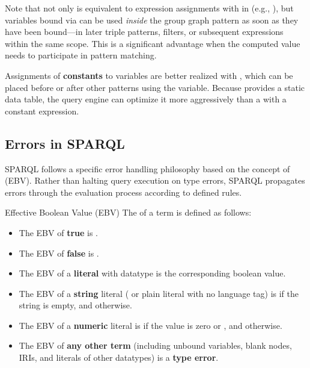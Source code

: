 \begin{note}{}
    Note that not only is  equivalent to expression assignments with  in  (e.g., ), but variables bound via  can be used \emph{inside} the group graph pattern as soon as they have been bound---in later triple patterns, filters, or subsequent  expressions within the same scope. 
    This is a significant advantage when the computed value needs to participate in pattern matching.

    Assignments of \textbf{constants} to variables are better realized with , which can be placed before or after other patterns using the variable. Because  provides a static data table, the query engine can optimize it more aggressively than a  with a constant expression.
\end{note}

\subsection{Errors in SPARQL}

SPARQL follows a specific error handling philosophy based on the concept of  (EBV). 
Rather than halting query execution on type errors, SPARQL propagates errors through the evaluation process according to defined rules.

\begin{definition}{Effective Boolean Value (EBV)}
    The  of a term is defined as follows:
    \begin{itemize}
        \item The EBV of \textbf{true} is .
        \item The EBV of \textbf{false} is .
        \item The EBV of a \textbf{literal} with datatype  is the corresponding boolean value.
        \item The EBV of a \textbf{string} literal ( or plain literal with no language tag) is  if the string is empty, and  otherwise.
        \item The EBV of a \textbf{numeric} literal is  if the value is zero or , and  otherwise.
        \item The EBV of \textbf{any other term} (including unbound variables, blank nodes, IRIs, and literals of other datatypes) is a \textbf{type error}.
    \end{itemize}
\end{definition}

